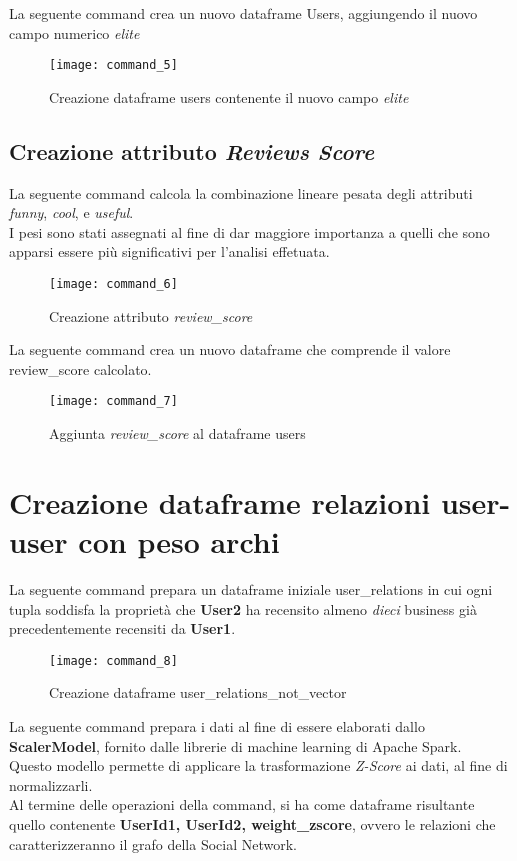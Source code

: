 La seguente command crea un nuovo dataframe Users, aggiungendo il nuovo campo
numerico \textit{elite}
\begin{figure}[!htbp]
	\texttt{[image: command\_5]}
	\caption{Creazione dataframe users contenente il nuovo campo \textit{elite}}
	\label{command_5}
\end{figure}

\subsection{Creazione attributo \textit{Reviews Score}}
La seguente command calcola la combinazione lineare pesata degli attributi \textit{funny},
\textit{cool}, e \textit{useful}.\\
I pesi sono stati assegnati al fine di dar maggiore importanza a quelli che
sono apparsi essere più significativi per l'analisi effetuata.
\begin{figure}[!htbp]
	\texttt{[image: command\_6]}
	\caption{Creazione attributo \textit{review\_score}}
	\label{command_6}
\end{figure}

La seguente command crea un nuovo dataframe che comprende il valore review\_score
calcolato.
\begin{figure}[!htbp]
	\texttt{[image: command\_7]}
	\caption{Aggiunta \textit{review\_score} al dataframe users}
	\label{command_7}
\end{figure}

\clearpage

\section{Creazione dataframe relazioni user-user con peso archi}
La seguente command prepara un dataframe iniziale user\_relations in cui ogni tupla
soddisfa la proprietà che \textbf{User2} ha recensito almeno \textit{dieci}
business già precedentemente recensiti da \textbf{User1}.
\begin{figure}[!htbp]
	\texttt{[image: command\_8]}
	\caption{Creazione dataframe user\_relations\_not\_vector}
	\label{command_8}
\end{figure}

\clearpage

La seguente command prepara i dati al fine di essere elaborati dallo
\textbf{ScalerModel}, fornito dalle librerie di machine learning di Apache Spark.\\
Questo modello permette di applicare la trasformazione \textit{Z-Score} ai dati,
al fine di normalizzarli.\\
Al termine delle operazioni della command, si ha come dataframe risultante quello
contenente \textbf{UserId1, UserId2, weight\_zscore}, ovvero le relazioni
che caratterizzeranno il grafo della Social Network.

